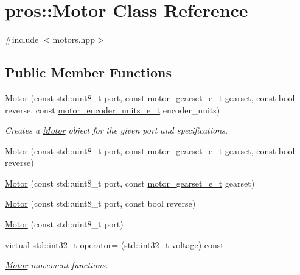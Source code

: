 \hypertarget{classpros_1_1Motor}{}\section{pros\+:\+:Motor Class Reference}
\label{classpros_1_1Motor}


{\ttfamily \#include $<$motors.\+hpp$>$}

\subsection*{Public Member Functions}
\begin{DoxyCompactItemize}
\item 
\hyperlink{classpros_1_1Motor_a5be9a41f9877208c887d5e2c081bc72e}{Motor} (const std\+::uint8\+\_\+t port, const \hyperlink{motors_8h_aa2f1c305c998abc3bf8dd1f76fa4da8b}{motor\+\_\+gearset\+\_\+e\+\_\+t} gearset, const bool reverse, const \hyperlink{motors_8h_a6677ba23760c558fd8b7b4e1e00a6123}{motor\+\_\+encoder\+\_\+units\+\_\+e\+\_\+t} encoder\+\_\+units)
\begin{DoxyCompactList}\small\item\em Creates a \hyperlink{classpros_1_1Motor}{Motor} object for the given port and specifications. \end{DoxyCompactList}\item 
\hyperlink{classpros_1_1Motor_a512050b652bf3034a21da12bf2b663ac}{Motor} (const std\+::uint8\+\_\+t port, const \hyperlink{motors_8h_aa2f1c305c998abc3bf8dd1f76fa4da8b}{motor\+\_\+gearset\+\_\+e\+\_\+t} gearset, const bool reverse)
\item 
\hyperlink{classpros_1_1Motor_aff27ad42b72a59c35e36a665bcd763a6}{Motor} (const std\+::uint8\+\_\+t port, const \hyperlink{motors_8h_aa2f1c305c998abc3bf8dd1f76fa4da8b}{motor\+\_\+gearset\+\_\+e\+\_\+t} gearset)
\item 
\hyperlink{classpros_1_1Motor_a822e0023951996ca7eff13ffe9cf953d}{Motor} (const std\+::uint8\+\_\+t port, const bool reverse)
\item 
\hyperlink{classpros_1_1Motor_a767b4ad39251b8e8411fae17a35b24ba}{Motor} (const std\+::uint8\+\_\+t port)
\item 
virtual std\+::int32\+\_\+t \hyperlink{classpros_1_1Motor_a4cf8a9518eb6cd268d27151f0df7fd38}{operator=} (std\+::int32\+\_\+t voltage) const
\begin{DoxyCompactList}\small\item\em \hyperlink{classpros_1_1Motor}{Motor} movement functions. \end{DoxyCompactList}\item 

\end{DoxyCompactItemize}
